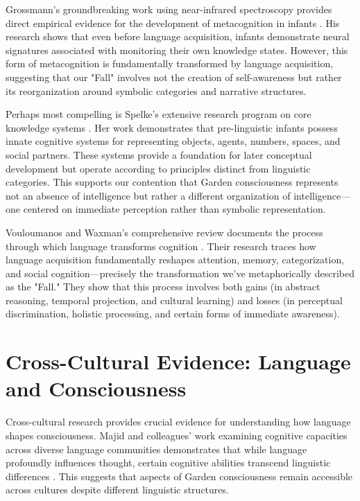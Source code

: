 Grossmann's groundbreaking work using near-infrared spectroscopy provides direct empirical evidence for the development of metacognition in infants \parencite{grossmann2023development}. His research shows that even before language acquisition, infants demonstrate neural signatures associated with monitoring their own knowledge states. However, this form of metacognition is fundamentally transformed by language acquisition, suggesting that our "Fall" involves not the creation of self-awareness but rather its reorganization around symbolic categories and narrative structures.

Perhaps most compelling is Spelke's extensive research program on core knowledge systems \parencite{spelke2024core}. Her work demonstrates that pre-linguistic infants possess innate cognitive systems for representing objects, agents, numbers, spaces, and social partners. These systems provide a foundation for later conceptual development but operate according to principles distinct from linguistic categories. This supports our contention that Garden consciousness represents not an absence of intelligence but rather a different organization of intelligence—one centered on immediate perception rather than symbolic representation.

Vouloumanos and Waxman's comprehensive review documents the process through which language transforms cognition \parencite{vouloumanos2022language}. Their research traces how language acquisition fundamentally reshapes attention, memory, categorization, and social cognition—precisely the transformation we've metaphorically described as the "Fall." They show that this process involves both gains (in abstract reasoning, temporal projection, and cultural learning) and losses (in perceptual discrimination, holistic processing, and certain forms of immediate awareness).

\section{Cross-Cultural Evidence: Language and Consciousness}

Cross-cultural research provides crucial evidence for understanding how language shapes consciousness. Majid and colleagues' work examining cognitive capacities across diverse language communities demonstrates that while language profoundly influences thought, certain cognitive abilities transcend linguistic differences \parencite{majid2024language}. This suggests that aspects of Garden consciousness remain accessible across cultures despite different linguistic structures.

